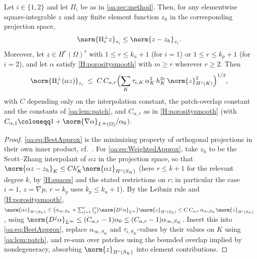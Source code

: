 \begin{lemma}
\label{oa:lem:bestapprox}
Let $i \in \{1,2\}$ and let $\Pi_i$ be as in \cref{oa:sec:method}. Then, for any
elementwise square-integrable $z$ and any finite element function $z_h$ in the
corresponding projection space,
\begin{equation}
  \label{oa:eq:BestApprox}
  \norm{\Pi_i^{\perp} z}_{\tau_i} \le \norm{z - z_h}_{\tau_i}.
\end{equation}
Moreover, let $z \in H^{r}(\Omega)^s$ with $1 \le r \le k_u+1$ (for $i = 1$) or
$1 \le r \le k_p + 1$ (for $i = 2$), and let $\alpha$ satisfy \cref{H:porositysmooth} with
$m \ge r$ wherever $r \ge 2$. Then
\begin{equation}
  \label{oa:eq:WeightedApprox}
  \norm{\Pi_i^{\perp}(\alpha z)}_{\tau_i}
  \;\le\;
  C\, C_{\alpha,r}
  \Bigl( \sum_K \tau_{i,K}\,\alpha_K^2\, h_K^{2r}\,\norm{z}_{H^{r}(K)}^2 \Bigr)^{1/2},
\end{equation}
with $C$ depending only on the interpolation constant, the patch-overlap constant and
the constants of \cref{oa:lem:patch}, and $C_{\alpha,r}$ as in \cref{H:porositysmooth}
(with $C_{\alpha,1} \coloneqq 1 + \norm{\nabla\alpha}_{L^\infty(\Omega)}/\alpha_0$).
\end{lemma}

\begin{proof}
\cref{oa:eq:BestApprox} is the minimizing property of orthogonal projections in their own
inner product, cf.~\cite[Remark~4]{codina2008analysis}. For \cref{oa:eq:WeightedApprox}, take
$z_h$ to be the Scott--Zhang interpolant of $\alpha z$ in the projection space, so that
$\norm{\alpha z - z_h}_{K} \le C h_K^{r} \norm{\alpha z}_{H^{r}(S_K)}$
(here $r \le k+1$ for the relevant degree $k$, by \cref{H:spaces} and the stated restrictions on
$r$; in particular the case $i=1$, $z = \nabla p$, $r = k_p$ uses $k_p \le k_u+1$).
By the Leibniz rule and \cref{H:porositysmooth},
$\norm{\alpha z}_{H^{r}(S_K)}
\le \bigl( \alpha_{\infty,S_K} + \sum_{j=1}^{r}\binom{r}{j}\norm{D^j\alpha}_{L^\infty}\bigr)
\norm{z}_{H^{r}(S_K)}
\le C\,C_{\alpha,r}\,\alpha_{\infty,S_K}\norm{z}_{H^{r}(S_K)}$,
using $\norm{D^j\alpha}_{L^\infty} \le (C_{\alpha,r}-1)\alpha_0 \le
(C_{\alpha,r}-1)\alpha_{\infty,S_K}$. Insert this into \cref{oa:eq:BestApprox}, replace
$\alpha_{\infty,S_K}$ and $\tau_{i,S_K}$-values by their values on $K$ using
\cref{oa:lem:patch}, and re-sum over patches using the bounded overlap implied by
nondegeneracy, absorbing $\norm{z}_{H^r(S_K)}$ into element contributions.
\end{proof}

